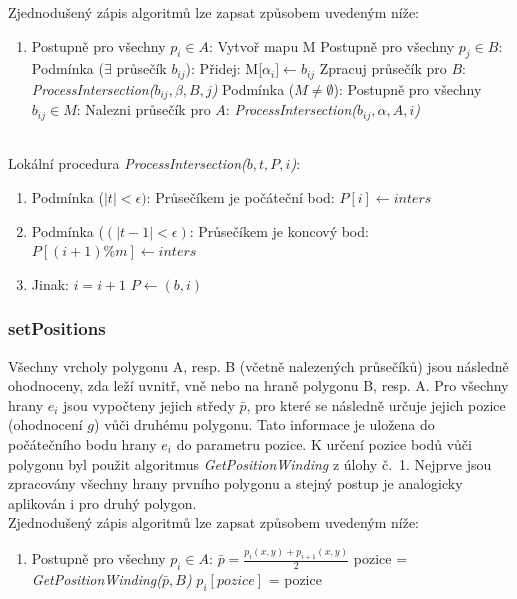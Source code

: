 \documentclass[a4paper, 12pt]{article}
\begin{document}
Zjednodušený zápis algoritmů lze zapsat způsobem uvedeným níže:

\begin{enumerate}
\item Postupně pro všechny $p_i \in A$:
\subitem Vytvoř mapu M 
\subitem Postupně pro všechny $p_j \in B$:
\subitem \hspace {0.5cm} Podmínka ($\exists$ průsečík $b_{ij}$):
\subitem \hspace {1cm} Přidej: M[$\alpha_{i}] \leftarrow b_{ij}$
\subitem \hspace {1cm} Zpracuj průsečík pro $B$: \textit{ProcessIntersection($b_{ij}, \beta, B, j$)}
\subitem Podmínka ($M \neq \emptyset$):
\subitem \hspace {0.5cm} Postupně pro všechny $b_{ij} \in M$:
\subitem \hspace {1cm} Nalezni průsečík pro $A$: \textit{ProcessIntersection($b_{ij}, \alpha, A, i$)}
\end{enumerate}
~\\

Lokální procedura \textit{ProcessIntersection($b, t, P, i$)}:
\begin{enumerate}
\item  Podmínka ($|t| < \epsilon)$: 
\subitem Průsečíkem je počáteční bod: $P[i] \leftarrow inters$
\item  Podmínka ($(|t-1| < \epsilon)$:
\subitem Průsečíkem je koncový bod: $P[(i+1)\%m] \leftarrow inters$
\item  Jinak:
\subitem $i = i+1$
\subitem $P \leftarrow (b,i)$
\end{enumerate}

\subsubsection{setPositions}
Všechny vrcholy polygonu A, resp. B (včetně nalezených průsečíků) jsou následně ohodnoceny, zda leží uvnitř, vně nebo na hraně polygonu B, resp. A. Pro všechny hrany $e_i$ jsou vypočteny jejich středy $\bar{p}$, pro které se následně určuje jejich pozice (ohodnocení $g$) vůči druhému polygonu. Tato informace je uložena do počátečního bodu hrany $e_i$ do parametru pozice. K určení pozice bodů vůči polygonu byl použit algoritmus \textit{GetPositionWinding} z úlohy č.~1. Nejprve jsou zpracovány všechny hrany prvního polygonu a stejný postup je analogicky aplikován i pro druhý polygon. \\

Zjednodušený zápis algoritmů lze zapsat způsobem uvedeným níže:
\begin{enumerate}
\item [] Postupně pro všechny $p_i \in A$:
\subitem $\bar{p} = \frac{p_i(x,y)+p_{i+1}(x,y)}{2}$
\subitem pozice = \textit{GetPositionWinding($\bar{p},B$)}
\subitem $p_i[pozice]$ = pozice
\end{enumerate}
\end{document}
